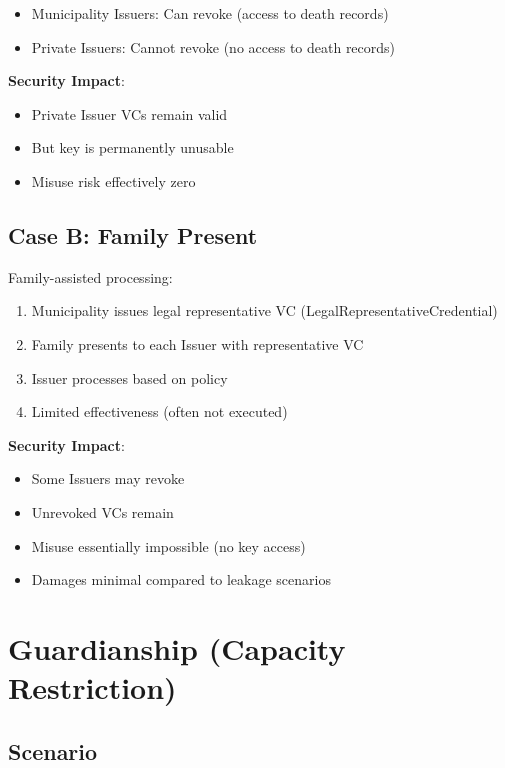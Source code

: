 \begin{itemize}
  \item Municipality Issuers: Can revoke (access to death records)
  \item Private Issuers: Cannot revoke (no access to death records)
\end{itemize}

\textbf{Security Impact}:
\begin{itemize}
  \item Private Issuer VCs remain valid
  \item But key is permanently unusable
  \item Misuse risk effectively zero
\end{itemize}

\subsection{Case B: Family Present}

Family-assisted processing:

\begin{enumerate}
  \item Municipality issues legal representative VC (LegalRepresentativeCredential)
  \item Family presents to each Issuer with representative VC
  \item Issuer processes based on policy
  \item Limited effectiveness (often not executed)
\end{enumerate}

\textbf{Security Impact}:
\begin{itemize}
  \item Some Issuers may revoke
  \item Unrevoked VCs remain
  \item Misuse essentially impossible (no key access)
  \item Damages minimal compared to leakage scenarios
\end{itemize}

\section{Guardianship (Capacity Restriction)}

\subsection{Scenario}

